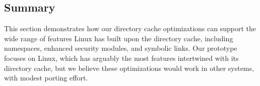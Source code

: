 \subsection{Summary}

This section demonstrates how our directory cache optimizations
can support the wide range of features Linux has built
upon the directory cache, including namespaces, enhanced security modules, and symbolic links.
Our prototype focuses on Linux, which has arguably the most features intertwined with its directory cache,
but we believe these optimizations would work in other systems, with modest 
porting effort.


